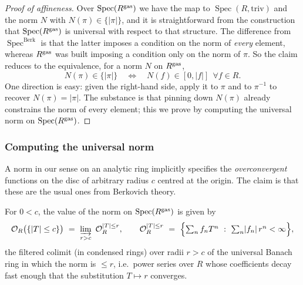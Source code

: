 \begin{proof}[Proof of affineness]
Over $\operatorname{Spec}(R^{\mathrm{gas}})$ we have the map to
$\operatorname{Spec}(R,\mathrm{triv})$ and the norm $N$ with
$N(\pi)\in\{\lvert\pi\rvert\}$, and it is straightforward from the construction
that $\operatorname{Spec}(R^{\mathrm{gas}})$ is universal with respect to that structure.
The difference from $\operatorname{Spec}^{\mathrm{Berk}}$ is that the latter
imposes a condition on the norm of \emph{every} element, whereas $R^{\mathrm{gas}}$ was
built imposing a condition only on the norm of $\pi$. So the claim reduces to
the equivalence, for a norm $N$ on $R^{\mathrm{gas}}$,
\begin{equation}
\label{eq:23:equivalence}
N(\pi)\in\{\lvert\pi\rvert\}
\quad\Longleftrightarrow\quad
N(f)\in[0,\lvert f\rvert]\ \ \forall f\in R .
\end{equation}
One direction is easy: given the right-hand side, apply it to $\pi$ and to
$\pi^{-1}$ to recover $N(\pi)=\lvert\pi\rvert$. The substance is that pinning
down $N(\pi)$ already constrains the norm of every element; this we prove by
computing the universal norm on $\operatorname{Spec}(R^{\mathrm{gas}})$.
\end{proof}

\subsubsection*{Computing the universal norm}

A norm in our sense on an analytic ring implicitly specifies the
\emph{overconvergent} functions on the disc of arbitrary radius $c$ centred at
the origin. The claim is that these are the usual ones from Berkovich theory.

\begin{proposition}
\label{prop:23:overconvergent}
For $0<c$, the value of the norm on $\operatorname{Spec}(R^{\mathrm{gas}})$ is given by
\begin{equation}
\label{eq:23:overconvergent}
\mathcal O_R\bigl(\{\lvert T\rvert\le c\}\bigr)\ =\
\varinjlim_{r>c}\ \mathcal O_R^{\lvert T\rvert\le r},
\qquad
\mathcal O_R^{\lvert T\rvert\le r}\ =\ \Bigl\{\textstyle\sum_n f_n T^n\ :\
\sum_n\lvert f_n\rvert\,r^n<\infty\Bigr\},
\end{equation}
the filtered colimit (in condensed rings) over radii $r>c$ of the universal
Banach ring in which the norm is $\le r$, i.e.\ power series over $R$ whose
coefficients decay fast enough that the substitution $T\mapsto r$ converges.
\end{proposition}

